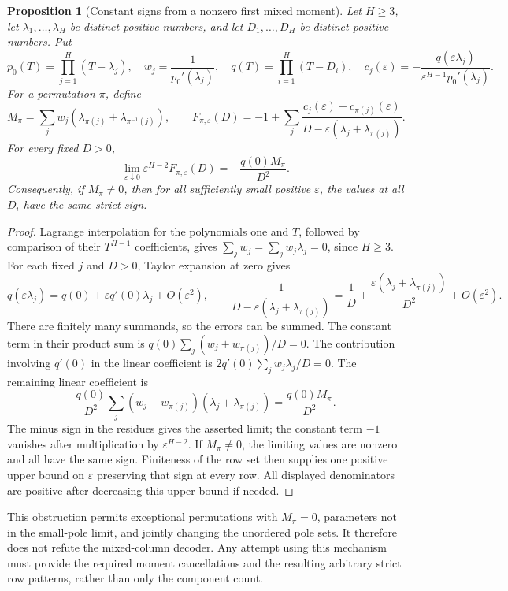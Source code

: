\documentclass[11pt]{article}
\newtheorem{proposition}{Proposition}
\begin{document}
\begin{proposition}[Constant signs from a nonzero first mixed moment]
Let $H\geq3$, let $\lambda_1,\ldots,\lambda_H$ be distinct positive
numbers, and let $D_1,\ldots,D_H$ be distinct positive numbers. Put
\[
 p_0(T)=\prod_{j=1}^H(T-\lambda_j),\quad
 w_j=\frac1{p_0'(\lambda_j)},\quad
 q(T)=\prod_{i=1}^H(T-D_i),\quad
 c_j(\varepsilon)=-\frac{q(\varepsilon\lambda_j)}
 {\varepsilon^{H-1}p_0'(\lambda_j)}.
\]
For a permutation $\pi$, define
\[
 M_\pi=\sum_jw_j(\lambda_{\pi(j)}+\lambda_{\pi^{-1}(j)}),
 \qquad
 F_{\pi,\varepsilon}(D)=-1+
 \sum_j\frac{c_j(\varepsilon)+c_{\pi(j)}(\varepsilon)}
 {D-\varepsilon(\lambda_j+\lambda_{\pi(j)})}.
\]
For every fixed $D>0$,
\[
 \lim_{\varepsilon\downarrow0}
 \varepsilon^{H-2}F_{\pi,\varepsilon}(D)
 =-\frac{q(0)M_\pi}{D^2}.
\]
Consequently, if $M_\pi\ne0$, then for all sufficiently small positive
$\varepsilon$, the values at all $D_i$ have the same strict sign.
\end{proposition}
\begin{proof}
Lagrange interpolation for the polynomials one and $T$, followed by
comparison of their $T^{H-1}$ coefficients, gives
$\sum_jw_j=\sum_jw_j\lambda_j=0$, since $H\geq3$.
For each fixed $j$ and $D>0$, Taylor expansion at zero gives
\[
 q(\varepsilon\lambda_j)
 =q(0)+\varepsilon q'(0)\lambda_j+O(\varepsilon^2),
 \qquad
 \frac1{D-\varepsilon(\lambda_j+\lambda_{\pi(j)})}
 =\frac1D+\frac{\varepsilon(\lambda_j+\lambda_{\pi(j)})}{D^2}
  +O(\varepsilon^2).
\]
There are finitely many summands, so the errors can be summed. The
constant term in their product sum is
$q(0)\sum_j(w_j+w_{\pi(j)})/D=0$.
The contribution involving $q'(0)$ in the linear coefficient is
$2q'(0)\sum_jw_j\lambda_j/D=0$. The remaining linear coefficient is
\[
 \frac{q(0)}{D^2}
 \sum_j(w_j+w_{\pi(j)})(\lambda_j+\lambda_{\pi(j)})
 =\frac{q(0)M_\pi}{D^2}.
\]
The minus sign in the residues gives the asserted limit; the constant
term $-1$ vanishes after multiplication by $\varepsilon^{H-2}$.
If $M_\pi\ne0$, the limiting values are nonzero and all have the same
sign. Finiteness of the row set then supplies one positive upper bound
on $\varepsilon$ preserving that sign at every row. All displayed
denominators are positive after decreasing this upper bound if needed.
\end{proof}

This obstruction permits exceptional permutations with $M_\pi=0$,
parameters not in the small-pole limit, and jointly changing the
unordered pole sets. It therefore does not refute the mixed-column
decoder. Any attempt using this mechanism must provide the required
moment cancellations and the resulting arbitrary strict row patterns,
rather than only the component count.
\end{document}
